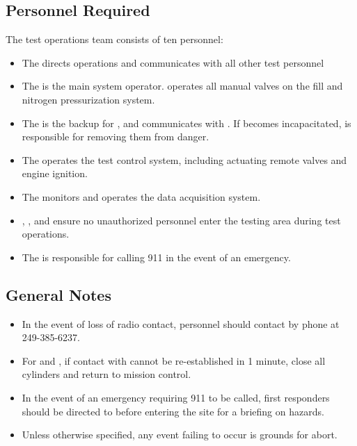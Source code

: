 \subsection{Personnel Required}
The test operations team consists of ten personnel:
\begin{itemize}
    \item The \opsfull{} directs operations and communicates with all other test personnel
    \item The \primaryfull{} is the main system operator. \primary{} operates all manual valves on the fill and nitrogen pressurization system.
    \item The \secondaryfull{} is the backup for \primary{}, and communicates with \ops{}. If \primary{} becomes incapacitated, \secondary{} is responsible for
        removing them from danger.
    \item The \rlcsfull{} operates the test control system, including actuating remote valves and engine ignition.
    \item The \daqfull{} monitors and operates the data acquisition system.
    \item \perifull{}, \periifull{}, \periiifull{} and \perivfull{} ensure no unauthorized personnel enter the testing area during test operations.
    \item The \emergencyfull{} is responsible for calling 911 in the event of an emergency. 
\end{itemize}
\setcounter{checklistnum}{0}


\subsection{General Notes}
\begin{itemize}
\item In the event of loss of radio contact, personnel should contact \ops{} by phone at 249-385-6237. 
\item For \primary{} and \secondary{}, if contact with \ops{} cannot be re-established in 1 minute, close all cylinders and return to mission control.
\item In the event of an emergency requiring 911 to be called, first responders should be directed to \ops{} before entering the site for a briefing on hazards.  
\item Unless otherwise specified, any event failing to occur is grounds for abort. 
\end{itemize}

